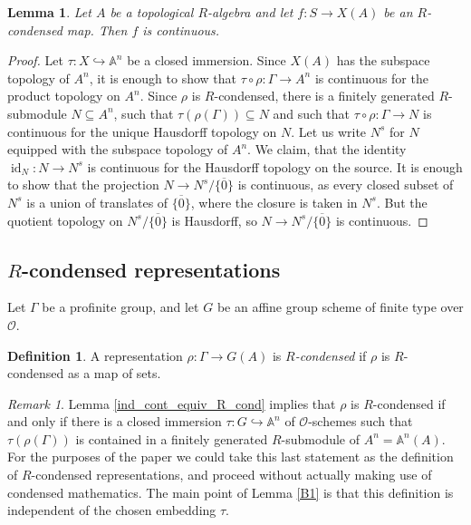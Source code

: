\documentclass{amsart}
\newtheorem{lem}[prop]{Lemma}
\theoremstyle{definition}
\newtheorem{defi}[prop]{Definition}
\theoremstyle{remark}
\newtheorem{remar}[prop]{Remark}
\DeclareMathOperator{\id}{id}
\newcommand{\OO}{\mathcal O}
\begin{document}
\begin{lem}\label{cond_is_cont}
    Let $A$ be a topological $R$-algebra and let $f : S \to X(A)$ be an $R$-condensed map.
    Then $f$ is continuous.
\end{lem}

\begin{proof}
    Let $\tau : X \hookrightarrow \mathbb A^n$ be a closed immersion. Since $X(A)$ has the subspace topology of $A^n$, it is enough to show that $\tau \circ \rho : \Gamma \to A^n$ is continuous for the product topology on $A^n$. Since $\rho$ is $R$-condensed, there is a finitely generated $R$-submodule $N \subseteq A^n$, such that $\tau(\rho(\Gamma)) \subseteq N$ and such that $\tau \circ \rho : \Gamma \to N$ is continuous for the unique Hausdorff topology on $N$. Let us write $N^s$ for $N$ equipped with the subspace topology of $A^n$. We claim, that the identity $\id_N : N \to N^s$ is continuous for the Hausdorff topology on the source. It is enough to show that the projection $N \to N^s/\overline{\{0\}}$ is continuous, as every closed subset of $N^s$ is a union of translates of $\overline{\{0\}}$, where the closure is taken in $N^s$. But the quotient topology on $N^s/\overline{\{0\}}$ is Hausdorff, so $N \to N^s/\overline{\{0\}}$ is continuous.
\end{proof}

\subsection{\texorpdfstring{$R$-condensed representations}{R-condensed representations}} Let $\Gamma$ be a profinite group, and let $G$ be an affine group scheme of finite type over $\OO$.
\begin{defi}\label{def_R_cond_rep} A  representation $\rho: \Gamma \rightarrow G(A)$ is 
\emph{$R$-condensed} if $\rho$ is $R$-condensed as a map of sets. 
\end{defi}
\begin{remar} Lemma \ref{ind_cont_equiv_R_cond} implies that $\rho$ is $R$-condensed if and only if 
there is a closed immersion $\tau: G\hookrightarrow \mathbb A^n$ of $\OO$-schemes such that $\tau(\rho(\Gamma))$ is contained in a finitely generated $R$-submodule of $A^n=\mathbb A^n(A)$. 
For the purposes of the paper we could take this last statement as the definition of $R$-condensed 
representations, and proceed without actually making use of condensed mathematics. The main point 
of Lemma \ref{B1} is that this definition is independent of the chosen embedding $\tau$.
\end{remar}
\end{document}
